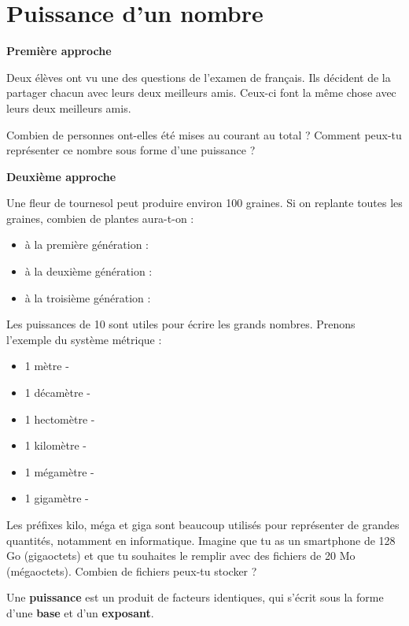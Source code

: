\documentclass[../../syllabus_1.tex]{subfiles}
\begin{document}
\section{Puissance d'un nombre}

\textbf{Première approche}

Deux élèves ont vu une des questions de l'examen de français. Ils décident de la partager chacun avec leurs deux meilleurs amis. Ceux-ci font la même chose avec leurs deux meilleurs amis. 

Combien de personnes ont-elles été mises au courant au total ? 
Comment peux-tu représenter ce nombre sous forme d'une puissance ? 

\textbf{Deuxième approche}

Une fleur de tournesol peut produire environ 100 graines. Si on replante toutes les graines, combien de plantes aura-t-on : 
\begin{itemize}[label=$\bullet$]
      \item à la première génération : 
      \item à la deuxième génération : 
      \item à la troisième génération : 
\end{itemize}

Les puissances de 10 sont utiles pour écrire les grands nombres. Prenons l'exemple du système métrique :
\begin{itemize}[label=$\bullet$]
      \item 1 mètre - 
      \item 1 décamètre - 
      \item 1 hectomètre - 
      \item 1 kilomètre - 
      \item 1 mégamètre - 
      \item 1 gigamètre - 
\end{itemize}

Les préfixes kilo, méga et giga sont beaucoup utilisés pour représenter de grandes quantités, notamment en informatique.
Imagine que tu as un smartphone de 128 Go (gigaoctets) et que tu souhaites le remplir avec des fichiers de 20 Mo (mégaoctets). Combien de fichiers peux-tu stocker ?
\vspace{2cm}

Une \textbf{puissance} est un produit de facteurs identiques, qui s'écrit sous la forme d'une \textbf{base} et d'un \textbf{exposant}. 
\end{document}
